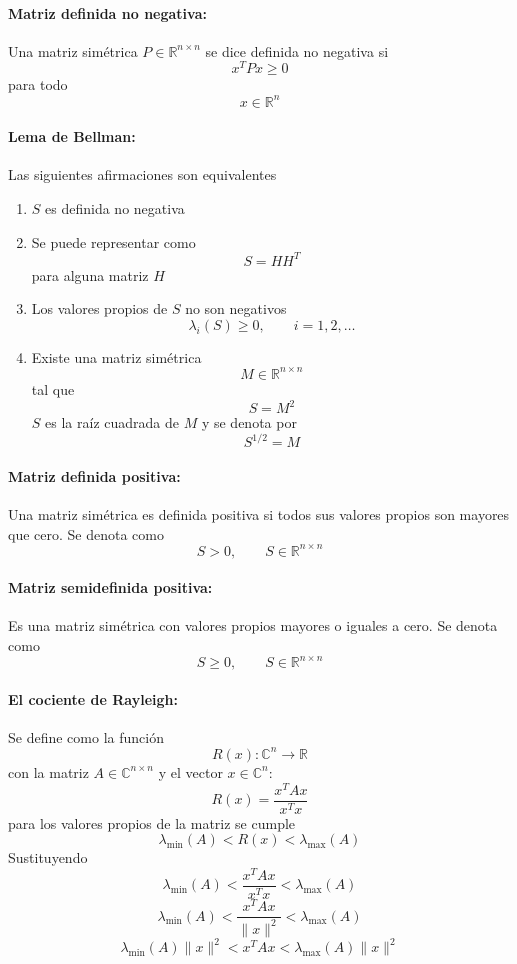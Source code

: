 \begin{flushright}
\end{flushright}

\paragraph{Matriz definida no negativa:}
Una matriz simétrica $P\in\mathbb{R}^{n\times n}$ se dice definida no negativa
si
\[
  x^{T}Px\geq 0
\]
para todo
\[
  x\in\mathbb{R}^{n}
\]

\paragraph{Lema de Bellman:}
Las siguientes afirmaciones son equivalentes

\begin{enumerate}
  \item $S$ es definida no negativa

  \item Se puede representar como
    \[
      S=HH^{T}
    \]
    para alguna matriz $H$

  \item Los valores propios de $S$ no son negativos
    \[
      \lambda_i(S)\geq 0, \qquad i=1,2,\ldots
    \]

  \item Existe una matriz simétrica
    \[
      M\in\mathbb{R}^{n\times n}
    \]
    tal que
    \[
      S=M^{2}
    \]
    $S$ es la raíz cuadrada de $M$ y se denota por
    \[
      S^{1/2}=M
    \]
\end{enumerate}

\paragraph{Matriz definida positiva:}
Una matriz simétrica es definida positiva si todos sus valores propios son
mayores que cero. Se denota como
\[
  S>0, \qquad S\in\mathbb{R}^{n\times n}
\]

\paragraph{Matriz semidefinida positiva:}
Es una matriz simétrica con valores propios mayores o iguales a cero. Se denota
como
\[
  S\geq 0, \qquad S\in\mathbb{R}^{n\times n}
\]

\paragraph{El cociente de Rayleigh:}
Se define como la función
\[
  R(x)\colon\mathbb{C}^{n}\longrightarrow\mathbb{R}
\]
con la matriz $A\in\mathbb{C}^{n\times n}$ y el vector
$x\in\mathbb{C}^{n}$:
\[
  R(x)=\frac{x^{T}Ax}{x^{T}x}
\]
para los valores propios de la matriz se cumple
\[
  \lambda_{\min}(A)<R(x)<\lambda_{\max}(A)
\]
Sustituyendo
\[
  \lambda_{\min}(A)
  <\frac{x^{T}Ax}{x^{T}x}
  <\lambda_{\max}(A)
\]
\[
  \lambda_{\min}(A)
  <\frac{x^{T}Ax}{\lVert x\rVert^{2}}
  <\lambda_{\max}(A)
\]
\[
  \lambda_{\min}(A)\lVert x\rVert^{2}
  <x^{T}Ax
  <\lambda_{\max}(A)\lVert x\rVert^{2}
\]


